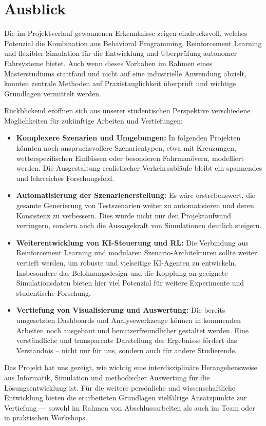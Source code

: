 \chapter{Ausblick}

Die im Projektverlauf gewonnenen Erkenntnisse zeigen eindrucksvoll, welches Potenzial die Kombination aus Behavioral Programming, Reinforcement Learning und flexibler Simulation für die Entwicklung und Überprüfung autonomer Fahrsysteme bietet. Auch wenn dieses Vorhaben im Rahmen eines Masterstudiums stattfand und nicht auf eine industrielle Anwendung abzielt, konnten zentrale Methoden auf Praxistauglichkeit überprüft und wichtige Grundlagen vermittelt werden.

Rückblickend eröffnen sich aus unserer studentischen Perspektive verschiedene Möglichkeiten für zukünftige Arbeiten und Vertiefungen:
\begin{itemize}
    \item \textbf{Komplexere Szenarien und Umgebungen:} In folgenden Projekten könnten noch anspruchsvollere Szenarientypen, etwa mit Kreuzungen, wetterspezifischen Einflüssen oder besonderen Fahrmanövern, modelliert werden. Die Ausgestaltung realistischer Verkehrsabläufe bleibt ein spannendes und lehrreiches Forschungsfeld.
    \item \textbf{Automatisierung der Szenarienerstellung:} Es wäre erstrebenswert, die gesamte Generierung von Testszenarien weiter zu automatisieren und deren Konsistenz zu verbessern. Dies würde nicht nur den Projektaufwand verringern, sondern auch die Aussagekraft von Simulationen deutlich steigern.
    \item \textbf{Weiterentwicklung von KI-Steuerung und RL:} Die Verbindung aus Reinforcement Learning und modularen Szenario-Architekturen sollte weiter vertieft werden, um robuste und vielseitige KI-Agenten zu entwickeln. Insbesondere das Belohnungsdesign und die Kopplung an geeignete Simulationsdaten bieten hier viel Potenzial für weitere Experimente und studentische Forschung.
    \item \textbf{Vertiefung von Visualisierung und Auswertung:} Die bereits umgesetzten Dashboards und Analysewerkzeuge können in kommenden Arbeiten noch ausgebaut und benutzerfreundlicher gestaltet werden. Eine verständliche und transparente Darstellung der Ergebnisse fördert das Verständnis – nicht nur für uns, sondern auch für andere Studierende.
\end{itemize}

Das Projekt hat uns gezeigt, wie wichtig eine interdisziplinäre Herangehensweise aus Informatik, Simulation und methodischer Auswertung für die Lösungsentwicklung ist. Für die weitere persönliche und wissenschaftliche Entwicklung bieten die erarbeiteten Grundlagen vielfältige Ansatzpunkte zur Vertiefung — sowohl im Rahmen von Abschlussarbeiten als auch im Team oder in praktischen Workshops.
